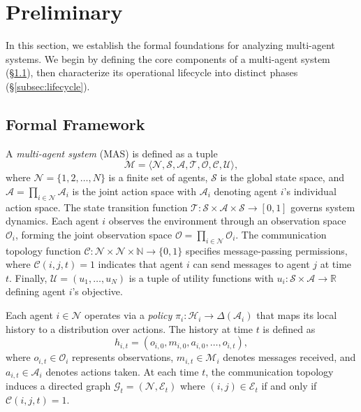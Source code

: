 \documentclass[11pt, letterpaper, shortlabels]{berkeley}
\begin{document}
\section{Preliminary}
\label{sec:preliminary}

In this section, we establish the formal foundations for analyzing multi-agent systems. We begin by defining the core components of a multi-agent system (\S\ref{subsec:formal_framework}), then characterize its operational lifecycle into distinct phases (\S\ref{subsec:lifecycle}).

\subsection{Formal Framework}
\label{subsec:formal_framework}

A \emph{multi-agent system} (MAS) is defined as a tuple 
\begin{equation}
\mathcal{M} = \langle \mathcal{N}, \mathcal{S}, \mathcal{A}, \mathcal{T}, \mathcal{O}, \mathcal{C}, \mathcal{U} \rangle,
\end{equation}
where $\mathcal{N} = \{1, 2, \ldots, N\}$ is a finite set of agents, $\mathcal{S}$ is the global state space, and $\mathcal{A} = \prod_{i \in \mathcal{N}} \mathcal{A}_i$ is the joint action space with $\mathcal{A}_i$ denoting agent $i$'s individual action space. The state transition function $\mathcal{T}: \mathcal{S} \times \mathcal{A} \times \mathcal{S} \to [0,1]$ governs system dynamics. Each agent $i$ observes the environment through an observation space $\mathcal{O}_i$, forming the joint observation space $\mathcal{O} = \prod_{i \in \mathcal{N}} \mathcal{O}_i$. The communication topology function $\mathcal{C}: \mathcal{N} \times \mathcal{N} \times \mathbb{N} \to \{0,1\}$ specifies message-passing permissions, where $\mathcal{C}(i,j,t) = 1$ indicates that agent $i$ can send messages to agent $j$ at time $t$. Finally, $\mathcal{U} = (u_1, \ldots, u_N)$ is a tuple of utility functions with $u_i: \mathcal{S} \times \mathcal{A} \to \mathbb{R}$ defining agent $i$'s objective.

Each agent $i \in \mathcal{N}$ operates via a \emph{policy} $\pi_i: \mathcal{H}_i \to \Delta(\mathcal{A}_i)$ that maps its local history to a distribution over actions. The history at time $t$ is defined as
\begin{equation}
h_{i,t} = (o_{i,0}, m_{i,0}, a_{i,0}, \ldots, o_{i,t}),
\end{equation}
where $o_{i,t} \in \mathcal{O}_i$ represents observations, $m_{i,t} \in \mathcal{M}_i$ denotes messages received, and $a_{i,t} \in \mathcal{A}_i$ denotes actions taken. At each time $t$, the communication topology induces a directed graph $\mathcal{G}_t = (\mathcal{N}, \mathcal{E}_t)$ where $(i,j) \in \mathcal{E}_t$ if and only if $\mathcal{C}(i,j,t) = 1$.
\end{document}
